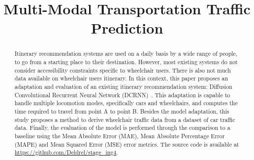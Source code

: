 \documentclass[conference]{IEEEtran}
\begin{document}



    \title{Multi-Modal Transportation Traffic Prediction}
    \author{\IEEEauthorblockN{[Anonymous]}}

    \maketitle

    \begin{abstract}
        Itinerary recommendation systems are used on a daily basis by a wide range of people, to go from a starting place to their destination.
        However, most existing systems do not consider accessibility constraints specific to wheelchair users.
        There is also not much data available on wheelchair users itinerary.
        In this context, this paper proposes an adaptation and evaluation of an existing itinerary recommendation system: Diffusion Convolutional Recurrent Neural Network (DCRNN)~\cite{DCRNN}.
        This adaptation is capable to handle multiple locomotion modes, specifically cars and wheelchairs, and computes the time required to travel from point A to point B.
        Besides the model adaptation, this study proposes a method to derive wheelchair traffic data from a dataset of car traffic data.
        Finally, the evaluation of the model is performed through the comparison to a baseline using the Mean Absolute Error (MAE), Mean Absolute Percentage Error (MAPE) and Mean Squared Error (MSE) error metrics.
        The source code is available at \url{https://github.com/Deldrel/stage_ing4}.
    \end{abstract}
\end{document}
